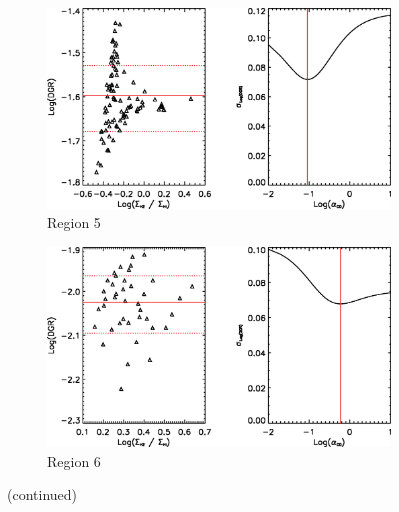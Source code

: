 \begin{figure}
  \ContinuedFloat
  \begin{subfigure}[t]{1\textwidth}
    \centering
    \includegraphics[width=1.\textwidth]{dgr_imgs/region_5_aco_output_10f.eps}
    \caption{Region 5}
  \end{subfigure}

  \begin{subfigure}[t]{1\textwidth}
    \centering
    \includegraphics[width=1.\textwidth]{dgr_imgs/region_6_aco_output_10f.eps}
    \caption{Region 6}
  \end{subfigure}
   \caption{(continued)}
   \label{fig:dgr_co10}
\end{figure}

